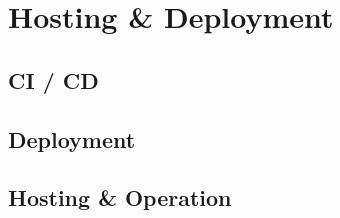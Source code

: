 \section{Hosting \& Deployment}

\subsection{CI / CD}

\subsection{Deployment}

\subsection{Hosting \& Operation}